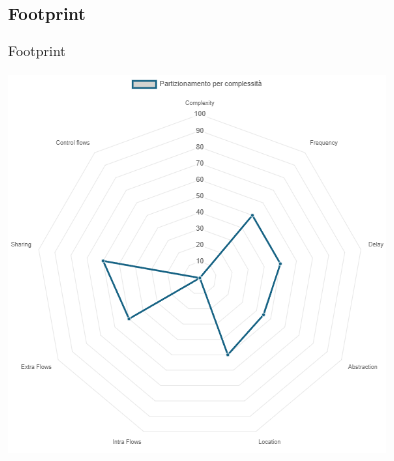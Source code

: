 \documentclass{beamer}
\begin{document}
	\subsubsection{Footprint}
	\begin{frame}{Footprint}
		\begin{center}
			\includegraphics[width=0.75\textwidth, height=0.75\textheight, keepaspectratio=true]{part_comp.png}
		\end{center}
	\end{frame}
\end{document}
